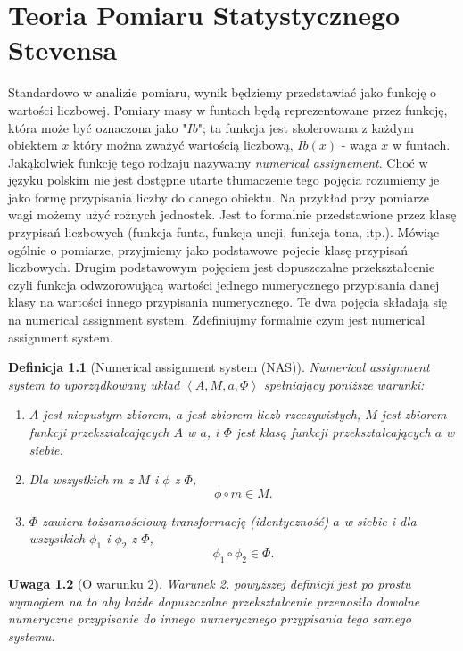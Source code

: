 \documentclass[12pt,a4paper]{report}
\newtheorem{definition}{Definicja}[chapter]
\newtheorem{remark}[definition]{Uwaga}
\newcommand{\tuple}[1]{\left\langle {#1} \right\rangle}
\begin{document}
\chapter{Teoria Pomiaru Statystycznego Stevensa}

Standardowo w analizie pomiaru, wynik będziemy przedstawiać jako funkcję o wartości liczbowej. Pomiary masy w funtach będą reprezentowane przez funkcję, która może być oznaczona jako "$Ib$";  ta funkcja jest skolerowana z każdym obiektem $x$ który można zważyć wartością liczbową, $Ib(x)$ - waga $x$ w funtach. Jakąkolwiek funkcję tego rodzaju nazywamy \textit{numerical assignement}. Choć w języku polskim nie jest dostępne utarte tłumaczenie tego pojęcia rozumiemy je jako formę przypisania liczby do danego obiektu. Na przykład przy pomiarze wagi możemy użyć rożnych jednostek. Jest to formalnie przedstawione  przez klasę przypisań liczbowych (funkcja funta, funkcja uncji, funkcja tona, itp.). Mówiąc ogólnie o pomiarze, przyjmiemy jako podstawowe pojecie klasę przypisań liczbowych. Drugim podstawowym pojęciem jest dopuszczalne przekształcenie czyli funkcja odwzorowującą wartości jednego numerycznego przypisania danej klasy na wartości innego przypisania numerycznego. Te dwa pojęcia składają się na numerical assignment system. Zdefiniujmy formalnie czym jest numerical assignment system.
\begin{definition}[Numerical assignment system (NAS)]
Numerical assignment system to uporządkowany układ $\tuple{A, M, a, \Phi}$ spełniający poniższe warunki:
\begin{enumerate}
\item
$A$ jest niepustym zbiorem, $a$ jest zbiorem liczb rzeczywistych, $M$ jest zbiorem funkcji przekształcających $A$ w $a$, i $\Phi$ jest klasą funkcji przekształcających $a$ w siebie.  
\item
Dla wszystkich $m$ z $M$ i $\phi$ z $\Phi$, 
$$
\phi \circ m \in M.
$$ 
\item
$\Phi$ zawiera tożsamościową transformację (identyczność) $a$ w siebie i dla wszystkich $\phi_{1}$ i $\phi_{2}$ z $\Phi$, 
$$
\phi_{1} \circ \phi_{2} \in \Phi.
$$

\end{enumerate}

\end{definition}

\begin{remark}[O warunku 2]
Warunek 2. powyższej definicji jest po prostu wymogiem na to aby każde dopuszczalne przekształcenie  przenosiło dowolne numeryczne przypisanie do innego numerycznego przypisania tego samego systemu.
\end{remark}
\end{document}
